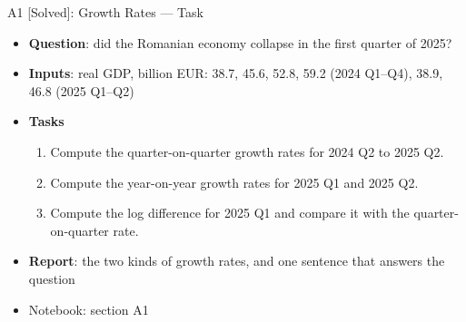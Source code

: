 \begin{frame}{A1 [Solved]: Growth Rates --- Task}
\itemsize{\small}
\begin{itemize}
\item \textbf{Question}: did the Romanian economy collapse in the first quarter of 2025?
\item \textbf{Inputs}: real GDP, billion EUR: 38.7, 45.6, 52.8, 59.2 (2024 Q1--Q4), 38.9, 46.8 (2025 Q1--Q2)
\item \textbf{Tasks}
\begin{enumerate}
    \item Compute the quarter-on-quarter growth rates for 2024 Q2 to 2025 Q2.
    \item Compute the year-on-year growth rates for 2025 Q1 and 2025 Q2.
    \item Compute the log difference for 2025 Q1 and compare it with the quarter-on-quarter rate.
\end{enumerate}
\item \textbf{Report}: the two kinds of growth rates, and one sentence that answers the question
\item Notebook: section A1
\end{itemize}
\end{frame}

